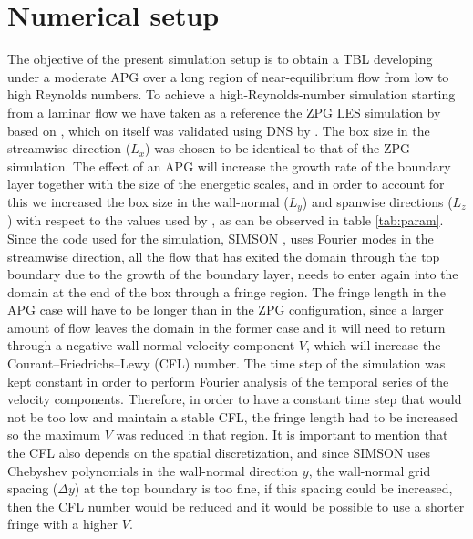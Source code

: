 
\section{Numerical setup} \label{sec:NumSetUp}
The objective of the present simulation setup is to obtain a TBL developing under a moderate APG over a long region of near-equilibrium flow from low to high Reynolds numbers. To achieve a high-Reynolds-number simulation starting from a laminar flow we have taken as a reference the ZPG LES simulation by \cite{E-AmorZPG} based on \cite{Schlatter_etAl_LES_2010}, which on itself was validated using DNS by \cite{schlatter_orlu_2010}. The box size in the streamwise direction ($L_x$) was chosen to be identical to that of the ZPG simulation. The effect of an APG will increase the growth rate of the boundary layer together with the size of the energetic scales, and in order to account for this we increased the box size in the wall-normal ($L_y$) and spanwise directions ($L_z$) with respect to the values used by \cite{E-AmorZPG}, as can be observed in table \ref{tab:param}. Since the code used for the simulation, SIMSON \citep{simson_techrep}, uses Fourier modes in the streamwise direction, all the flow that has exited the domain through the top boundary due to the growth of the boundary layer, needs to enter again into the domain at the end of the box through a fringe region. 
The fringe length in the APG case will have to be longer than in the ZPG configuration, since a larger amount of flow leaves the domain in the former case and it will need to return through a negative wall-normal velocity component $V$, which will increase the Courant--Friedrichs--Lewy (CFL) number. The time step of the simulation was kept constant in order to perform Fourier analysis of the temporal series of the velocity components. Therefore, in order to have a constant time step that would not be too low and maintain a stable CFL, the fringe length had to be increased so the maximum $V$ was reduced in that region. It is important to mention that the CFL also depends on the spatial discretization, and since SIMSON uses Chebyshev polynomials in the wall-normal direction $y$, the wall-normal grid spacing ($\Delta y$) at the top boundary is too fine, if this spacing could be increased, then the CFL number would be reduced and it would be possible to use a shorter fringe with a higher $V$.


